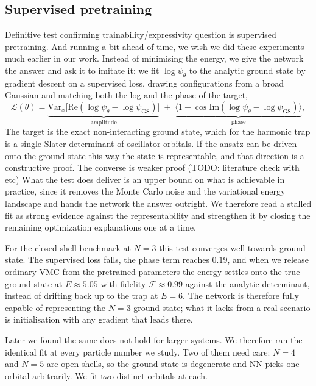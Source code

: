 \documentclass[a4paper,11pt,twoside]{article}
\begin{document}
\subsection{Supervised pretraining}
\label{sec:pretraining}

Definitive test confirming trainability/expressivity question is supervised pretraining. And running a bit ahead of time, we wish we did these experiments much earlier in our work. Instead of minimising the energy, we give the network the answer and ask it to imitate it: we fit $\log\psi_{\theta}$ to the analytic ground state by gradient descent on a supervised loss, drawing configurations from a broad Gaussian and matching both the log and the phase of the target,
\begin{equation}
    \mathcal{L}(\theta) = \underbrace{\mathrm{Var}_x\!\big[\mathrm{Re}(\log\psi_\theta - \log\psi_{\mathrm{GS}})\big]}_{\text{amplitude}} \; + \; \underbrace{\big\langle 1 - \cos\mathrm{Im}(\log\psi_\theta - \log\psi_{\mathrm{GS}})\big\rangle}_{\text{phase}},
    \label{eq:supervised_loss}
\end{equation}
The target is the exact non-interacting ground state, which for the harmonic trap is a single Slater determinant of oscillator orbitals. If the ansatz can be driven onto the ground state this way the state is representable, and that direction is a constructive proof. The converse is weaker proof (TODO: literature check with \cite{wu_supervised_2024} etc) What the test does deliver is an upper bound on what is achievable in practice, since it removes the Monte Carlo noise and the variational energy landscape and hands the network the answer outright. We therefore read a stalled fit as strong evidence against the representability and strengthen it by closing the remaining optimization explanations one at a time.

For the closed-shell benchmark at $N=3$ this test converges well towards ground state. The supervised loss falls, the phase term reaches $0.19$, and when we release ordinary VMC from the pretrained parameters the energy settles onto the true ground state at $E \approx 5.05$ with fidelity $\mathcal{F} \approx 0.99$ against the analytic determinant, instead of drifting back up to the trap at $E=6$. The network is therefore fully capable of representing the $N=3$ ground state; what it lacks from a real scenario is initialisation with any gradient that leads there. 

Later we found the same does not hold for larger systems. We therefore ran the identical fit at every particle number we study. Two of them need care: $N=4$ and $N=5$ are open shells, so the ground state is degenerate and NN picks one orbital arbitrarily. We fit two distinct orbitals at each.
\end{document}
